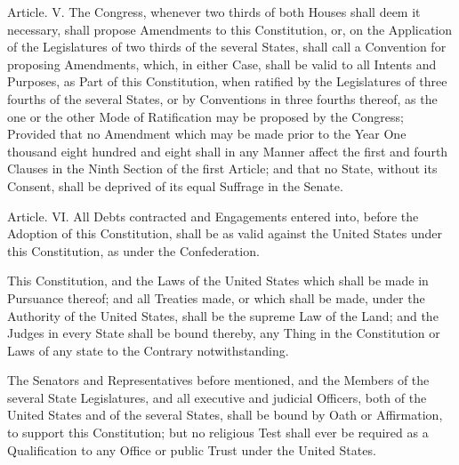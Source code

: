 \documentclass{article}
\begin{document}
Article. V.  The Congress, whenever two thirds of both Houses shall deem it
necessary, shall propose Amendments to this Constitution, or, on the Application
of the Legislatures of two thirds of the several States, shall call a Convention
for proposing Amendments, which, in either Case, shall be valid to all Intents
and Purposes, as Part of this Constitution, when ratified by the Legislatures of
three fourths of the several States, or by Conventions in three fourths thereof,
as the one or the other Mode of Ratification may be proposed by the Congress;
Provided that no Amendment which may be made prior to the Year One thousand
eight hundred and eight shall in any Manner affect the first and fourth Clauses
in the Ninth Section of the first Article; and that no State, without its
Consent, shall be deprived of its equal Suffrage in the Senate.


Article. VI.  All Debts contracted and Engagements entered into, before the
Adoption of this Constitution, shall be as valid against the United States under
this Constitution, as under the Confederation.

This Constitution, and the Laws of the United States which shall be made in
Pursuance thereof; and all Treaties made, or which shall be made, under the
Authority of the United States, shall be the supreme Law of the Land; and the
Judges in every State shall be bound thereby, any Thing in the Constitution or
Laws of any state to the Contrary notwithstanding.

The Senators and Representatives before mentioned, and the Members of the
several State Legislatures, and all executive and judicial Officers, both of the
United States and of the several States, shall be bound by Oath or Affirmation,
to support this Constitution; but no religious Test shall ever be required as a
Qualification to any Office or public Trust under the United States.
\end{document}
